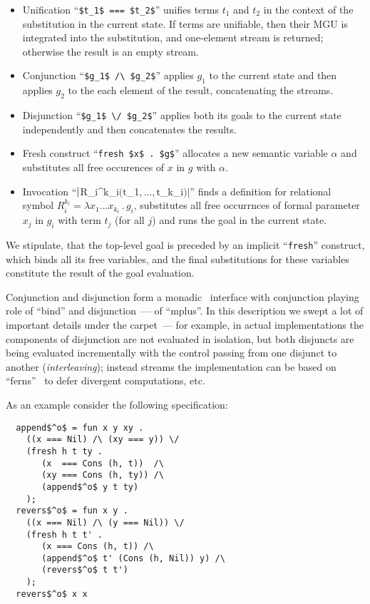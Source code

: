 \begin{itemize}
\item Unification ``\lstinline|$t_1$ === $t_2$|'' unifies terms $t_1$ and $t_2$ in the context of the substitution in the current state. If terms are unifiable,
  then their MGU is integrated into the substitution, and one-element stream is returned; otherwise the result is an empty stream.
\item Conjunction ``\lstinline|$g_1$ /\ $g_2$|'' applies $g_1$ to the current state and then applies $g_2$ to the each element of the result, concatenating
  the streams.
\item Disjunction ``\lstinline|$g_1$ \/ $g_2$|'' applies both its goals to the current state independently and then concatenates the results.
\item Fresh construct ``\lstinline|fresh $x$ . $g$|'' allocates a new semantic variable $\alpha$ and substitutes all free occurences of $x$ in $g$ with $\alpha$.
\item Invocation ``$\lstinline|$R_i^{k_i}$ ($t_1$,...,$t_{k_i}$)|$'' finds a definition for relational symbol $R_i^{k_i}=\lambda x_1\dots x_{k_i}\,.\,g_i$, substitutes
  all free occurrnces of formal parameter $x_j$ in $g_i$ with term $t_j$ (for all $j$) and runs the goal in the current state.
\end{itemize}

We stipulate, that the top-level goal is preceded by an implicit ``\lstinline|fresh|'' construct, which binds all its free variables, and the final substitutions for these
variables constitute the result of the goal evaluation.

Conjunction and disjunction form a monadic~\cite{Monads} interface with conjunction playing role of ``bind'' and disjunction~--- of ``mplus''. In this description
we swept a lot of important details under the carpet~--- for example, in actual implementations the components of disjunction are not evaluated in isolation, but
both disjuncts are being evaluated incrementally with the control passing from one disjunct to another (\emph{interleaving}); instead streams the implementation
can be based on ``ferns''~\cite{BottomAvoiding} to defer divergent computations, etc.

As an example consider the following specification:

\begin{lstlisting}
  append$^o$ = fun x y xy .
    ((x === Nil) /\ (xy === y)) \/
    (fresh h t ty .
       (x  === Cons (h, t))  /\
       (xy === Cons (h, ty)) /\
       (append$^o$ y t ty)
    );
  revers$^o$ = fun x y .
    ((x === Nil) /\ (y === Nil)) \/
    (fresh h t t' .
       (x === Cons (h, t)) /\
       (append$^o$ t' (Cons (h, Nil)) y) /\
       (revers$^o$ t t') 
    );
  revers$^o$ x x
\end{lstlisting}

